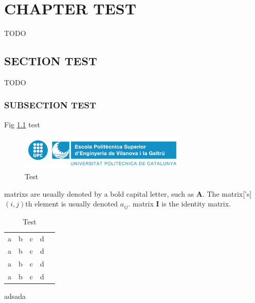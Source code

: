 \newpage
\pagestyle{plain}

\chapter{CHAPTER TEST}

TODO
\section{SECTION TEST}

TODO

\subsection{SUBSECTION TEST}

Fig \ref{fig:test} test

\begin{figure}[h]
    \includegraphics[width=8cm]{media/epsevg_logo}
    \centering
    \caption{Test}
    \label{fig:test}
\end{figure}

\Glspl{matrix} are usually denoted by a bold capital letter, such as $\mathbf{A}$. The \gls{matrix}['s] $(i,j)$th element is usually denoted $a_{ij}$. \Gls{matrix} $\mathbf{I}$ is the identity \gls{matrix}. 


\begin{table}[]
\centering
\begin{tabular}{lllll}
  a  & b & c & d &  \\
  a  & b & c & d &  \\
  a  & b & c & d &  \\
  a  & b & c & d & 
\end{tabular}
\caption{Test}
\label{table:test}
\end{table}

adsada \cite{texbook}
